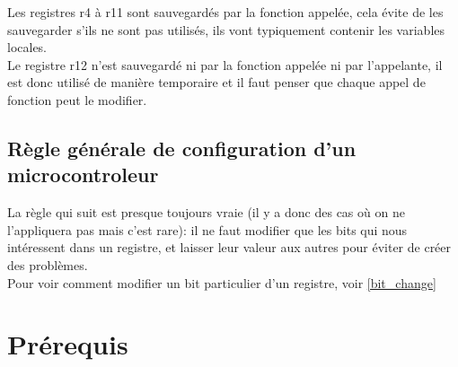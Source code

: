 \documentclass[a4paper,10pt]{article} %
\begin{document}
Les registres r4 à r11 sont sauvegardés par la fonction appelée, cela évite de les sauvegarder s'ils ne sont pas utilisés, ils vont typiquement contenir les variables locales.\\

Le registre r12 n'est sauvegardé ni par la fonction appelée ni par l'appelante, il est donc utilisé de manière temporaire et il faut penser que chaque appel de fonction peut le modifier.

\subsection{Règle générale de configuration d'un microcontroleur}
La règle qui suit est presque toujours vraie (il y a donc des cas où on ne l'appliquera pas mais c'est rare): il ne faut modifier que les bits qui nous intéressent dans un registre, et laisser leur valeur aux autres pour éviter de créer des problèmes.\\

Pour voir comment modifier un bit particulier d'un registre, voir \autoref{bit_change} 

\section{Prérequis}
\end{document}
